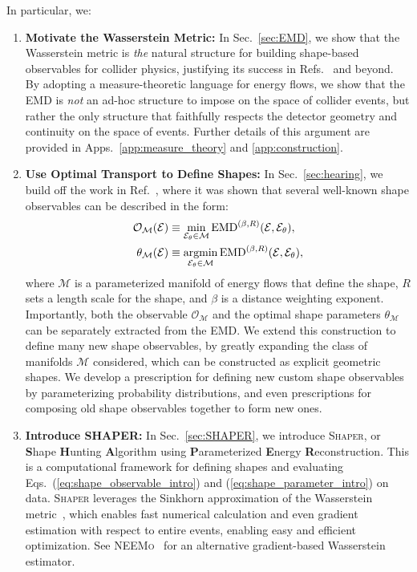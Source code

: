 \documentclass[letterpaper,11pt]{article}
\newcommand{\E}{\mathcal{E}}
\newcommand{\M}{\mathcal{M}}
\renewcommand{\O}{\mathcal{O}}
\DeclareMathOperator*{\argmin}{argmin}
\DeclareRobustCommand{\Sec}[1]{Sec.~\ref{sec:#1}}
\DeclareRobustCommand{\Apps}[2]{Apps.~\ref{app:#1} and \ref{app:#2}}
\DeclareRobustCommand{\Eqs}[2]{Eqs.~(\ref{eq:#1}) and (\ref{eq:#2})}
\DeclareRobustCommand{\Refer}[1]{Ref.~\cite{#1}}
\newcommand{\Shaper}{\textsc{Shaper}\xspace}
\begin{document}
In particular, we:
%
\begin{enumerate}

    \item \textbf{Motivate the Wasserstein Metric:}
    In \Sec{EMD}, we show that the Wasserstein metric is \emph{the} natural structure for building shape-based observables for collider physics, justifying its success in Refs.~\cite{2020, Komiske_2019, Komiske:2019jim, Collins:2021pld, Park:2022zov, CrispimRomao:2020ejk, Cai:2020vzx,Cai:2021hnn, Cesarotti:2020hwb, Cesarotti_2021, ATLAS:2022jwu} and beyond.
    By adopting a measure-theoretic language for energy flows, we show that the EMD is \emph{not} an ad-hoc structure to impose on the space of collider events, but rather the only structure that faithfully respects the detector geometry and continuity on the space of events.
    Further details of this argument are provided in \Apps{measure_theory}{construction}.
 
 
    \item \textbf{Use Optimal Transport to Define Shapes:}
    In \Sec{hearing}, we build off the work in \Refer{2020}, where it was shown that several well-known shape observables can be described in the form:
    \begin{align}
    \mathcal{O}_\M(\E) &\equiv \min_{\E_\theta \in \M} {\rm EMD}^{(\beta, R)}(\E, \E_\theta), \label{eq:shape_observable_intro} \\
    \theta_\M(\E) &\equiv \argmin_{\E_\theta \in \M} {\rm EMD}^{(\beta, R)}(\E, \E_\theta), \label{eq:shape_parameter_intro} 
    \end{align}
    where $\M$ is a parameterized manifold of energy flows that define the shape, $R$ sets a length scale for the shape, and $\beta$ is a distance weighting exponent. Importantly, both the observable $\O_\M$ and the optimal shape parameters $\theta_\M$ can be separately extracted from the EMD. 
    We extend this construction to define many new shape observables, by greatly expanding the class of manifolds $\M$ considered, which can be constructed as explicit geometric shapes. 
    We develop a prescription for defining new custom shape observables by parameterizing probability distributions, and even prescriptions for composing old shape observables together to form new ones.

        
    \item \textbf{Introduce \textsc{SHAPER}:} In \Sec{SHAPER}, we introduce \Shaper, or \textbf{S}hape \textbf{H}unting \textbf{A}lgorithm using \textbf{P}arameterized \textbf{E}nergy \textbf{R}econstruction.  This is a computational framework for defining shapes and evaluating \Eqs{shape_observable_intro}{shape_parameter_intro} on data.
    \Shaper leverages the Sinkhorn approximation of the Wasserstein metric~\cite{sinkhorn_1966, cuturi2013sinkhorn, CLASON2021124432, feydy2019interpolating}, which enables fast numerical calculation and even gradient estimation with respect to entire events, enabling easy and efficient optimization. See \textsc{NEEMo}~\cite{Kitouni:2022qyr} for an alternative gradient-based Wasserstein estimator.
    

\end{enumerate}
\end{document}
